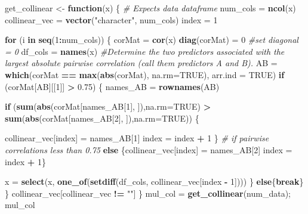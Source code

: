 \documentclass[]{article}
\newenvironment{Shaded}{\begin{snugshade}}{\end{snugshade}}
\newcommand{\CommentTok}[1]{\textcolor[rgb]{0.56,0.35,0.01}{\textit{#1}}}
\newcommand{\ControlFlowTok}[1]{\textcolor[rgb]{0.13,0.29,0.53}{\textbf{#1}}}
\newcommand{\DataTypeTok}[1]{\textcolor[rgb]{0.13,0.29,0.53}{#1}}
\newcommand{\DecValTok}[1]{\textcolor[rgb]{0.00,0.00,0.81}{#1}}
\newcommand{\FloatTok}[1]{\textcolor[rgb]{0.00,0.00,0.81}{#1}}
\newcommand{\KeywordTok}[1]{\textcolor[rgb]{0.13,0.29,0.53}{\textbf{#1}}}
\newcommand{\NormalTok}[1]{#1}
\newcommand{\OperatorTok}[1]{\textcolor[rgb]{0.81,0.36,0.00}{\textbf{#1}}}
\newcommand{\OtherTok}[1]{\textcolor[rgb]{0.56,0.35,0.01}{#1}}
\newcommand{\StringTok}[1]{\textcolor[rgb]{0.31,0.60,0.02}{#1}}
\begin{document}
\begin{Shaded}
\begin{Highlighting}[]
\NormalTok{get_collinear <-}\StringTok{ }\ControlFlowTok{function}\NormalTok{(x) \{}
  \CommentTok{# Expects data dataframe}
\NormalTok{  num_cols =}\StringTok{ }\KeywordTok{ncol}\NormalTok{(x)}
\NormalTok{  collinear_vec =}\StringTok{ }\KeywordTok{vector}\NormalTok{(}\StringTok{"character"}\NormalTok{, num_cols) }
\NormalTok{  index =}\StringTok{ }\DecValTok{1}
  
  \ControlFlowTok{for}\NormalTok{ (i }\ControlFlowTok{in} \KeywordTok{seq}\NormalTok{(}\DecValTok{1}\OperatorTok{:}\NormalTok{num_cols)) \{}
\NormalTok{    corMat =}\StringTok{ }\KeywordTok{cor}\NormalTok{(x)}
    \KeywordTok{diag}\NormalTok{(corMat) =}\StringTok{ }\DecValTok{0}  \CommentTok{#set diagonal = 0}
\NormalTok{    df_cols =}\StringTok{ }\KeywordTok{names}\NormalTok{(x)}
    \CommentTok{#Determine the two predictors associated with the largest absolute pairwise     correlation (call them predictors A and B).}
\NormalTok{    AB =}\StringTok{ }\KeywordTok{which}\NormalTok{(corMat }\OperatorTok{==}\StringTok{ }\KeywordTok{max}\NormalTok{(}\KeywordTok{abs}\NormalTok{(corMat), }\DataTypeTok{na.rm=}\OtherTok{TRUE}\NormalTok{), }\DataTypeTok{arr.ind =} \OtherTok{TRUE}\NormalTok{)}
    \ControlFlowTok{if}\NormalTok{ (corMat[AB][[}\DecValTok{1}\NormalTok{]] }\OperatorTok{>}\StringTok{ }\FloatTok{0.75}\NormalTok{) \{}
\NormalTok{      names_AB =}\StringTok{ }\KeywordTok{rownames}\NormalTok{(AB)}
      
      \ControlFlowTok{if}\NormalTok{ (}\KeywordTok{sum}\NormalTok{(}\KeywordTok{abs}\NormalTok{(corMat[names_AB[}\DecValTok{1}\NormalTok{], ]),}\DataTypeTok{na.rm=}\OtherTok{TRUE}\NormalTok{) }\OperatorTok{>}\StringTok{ }\KeywordTok{sum}\NormalTok{(}\KeywordTok{abs}\NormalTok{(corMat[names_AB[}\DecValTok{2}\NormalTok{],  ]),}\DataTypeTok{na.rm=}\OtherTok{TRUE}\NormalTok{)) \{}
        
\NormalTok{        collinear_vec[index] =}\StringTok{ }\NormalTok{names_AB[}\DecValTok{1}\NormalTok{]}
\NormalTok{        index =}\StringTok{ }\NormalTok{index }\OperatorTok{+}\StringTok{ }\DecValTok{1}
\NormalTok{      \} }
      \CommentTok{# if pairwise correlations less than 0.75}
      \ControlFlowTok{else}\NormalTok{ \{collinear_vec[index] =}\StringTok{ }\NormalTok{names_AB[}\DecValTok{2}\NormalTok{]}
\NormalTok{            index =}\StringTok{ }\NormalTok{index }\OperatorTok{+}\StringTok{ }\DecValTok{1}\NormalTok{\}}
      
\NormalTok{      x =}\StringTok{ }\KeywordTok{select}\NormalTok{(x, }\KeywordTok{one_of}\NormalTok{(}\KeywordTok{setdiff}\NormalTok{(df_cols, collinear_vec[index }\OperatorTok{-}\StringTok{ }\DecValTok{1}\NormalTok{])))}
\NormalTok{    \}}
    \ControlFlowTok{else}\NormalTok{\{}\ControlFlowTok{break}\NormalTok{\} }
\NormalTok{  \}}
\NormalTok{  collinear_vec[collinear_vec }\OperatorTok{!=}\StringTok{ ""}\NormalTok{]}
\NormalTok{\}}
\NormalTok{mul_col =}\StringTok{ }\KeywordTok{get_collinear}\NormalTok{(num_data); mul_col}
\end{Highlighting}
\end{Shaded}
\end{document}

